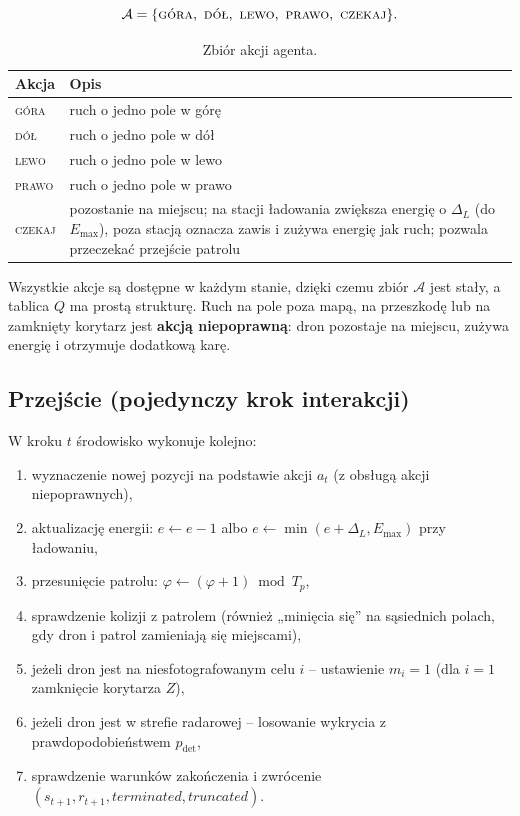 \[
  \mathcal{A} = \{\textsc{góra},\ \textsc{dół},\ \textsc{lewo},\ \textsc{prawo},\ \textsc{czekaj}\}.
\]

\begin{table}[h]
\centering
\begin{tabular}{p{}p{}}
\toprule
Akcja & Opis \\
\midrule
\textsc{góra} & ruch o jedno pole w górę \\
\textsc{dół} & ruch o jedno pole w dół \\
\textsc{lewo} & ruch o jedno pole w lewo \\
\textsc{prawo} & ruch o jedno pole w prawo \\
\textsc{czekaj} & pozostanie na miejscu; na stacji ładowania zwiększa energię
  o $\Delta_L$ (do $E_{\max}$), poza stacją oznacza zawis i zużywa energię
  jak ruch; pozwala przeczekać przejście patrolu \\
\bottomrule
\end{tabular}
\caption{Zbiór akcji agenta.}
\label{tab:akcje}
\end{table}

Wszystkie akcje są dostępne w każdym stanie, dzięki czemu zbiór
$\mathcal{A}$ jest stały, a tablica $Q$ ma prostą strukturę. Ruch na pole
poza mapą, na przeszkodę lub na zamknięty korytarz jest \textbf{akcją
niepoprawną}: dron pozostaje na miejscu, zużywa energię i otrzymuje
dodatkową karę.

\subsection{Przejście (pojedynczy krok interakcji)}

W kroku $t$ środowisko wykonuje kolejno:
\begin{enumerate}
  \item wyznaczenie nowej pozycji na podstawie akcji $a_t$ (z obsługą akcji
        niepoprawnych),
  \item aktualizację energii: $e \leftarrow e - 1$ albo
        $e \leftarrow \min(e + \Delta_L, E_{\max})$ przy ładowaniu,
  \item przesunięcie patrolu: $\varphi \leftarrow (\varphi + 1) \bmod T_p$,
  \item sprawdzenie kolizji z patrolem (również „minięcia się'' na sąsiednich
        polach, gdy dron i patrol zamieniają się miejscami),
  \item jeżeli dron jest na niesfotografowanym celu $i$ -- ustawienie $m_i = 1$
        (dla $i=1$ zamknięcie korytarza $Z$),
  \item jeżeli dron jest w strefie radarowej -- losowanie wykrycia
        z prawdopodobieństwem $p_{\text{det}}$,
  \item sprawdzenie warunków zakończenia i zwrócenie $(s_{t+1}, r_{t+1},
        \textit{terminated}, \textit{truncated})$.
\end{enumerate}

